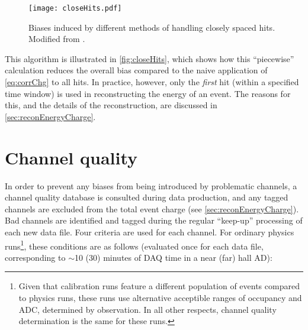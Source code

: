 \documentclass[../thesis.tex]{subfiles}
\begin{document}
\begin{figure}[ht]
  \texttt{[image: closeHits.pdf]}
  \caption{Biases induced by different methods of handling closely spaced hits. Modified from \cite{closeHits}.}
  \label{fig:closeHits}
\end{figure}

This algorithm is illustrated in \autoref{fig:closeHits}, which shows how this ``piecewise'' calculation reduces the overall bias compared to the naive application of \autoref{eq:corrChg} to all hits. In practice, however, only the \emph{first} hit (within a specified time window) is used in reconstructing the energy of an event. The reasons for this, and the details of the reconstruction, are discussed in \autoref{sec:reconEnergyCharge}.



\section{Channel quality}
\label{sec:calibCQ}

In order to prevent any biases from being introduced by problematic channels, a channel quality database is consulted during data production, and any tagged channels are excluded from the total event charge (see \autoref{sec:reconEnergyCharge}). Bad channels are identified and tagged during the regular ``keep-up'' processing of each new data file. Four criteria are used for each channel. For ordinary physics runs\footnote{Given that calibration runs feature a different population of events compared to physics runs, these runs use alternative acceptible ranges of occupancy and ADC, determined by observation. In all other respects, channel quality determination is the same for these runs.}, these conditions are as follows (evaluated once for each data file, corresponding to $\sim$10 (30) minutes of DAQ time in a near (far) hall AD):
\end{document}
